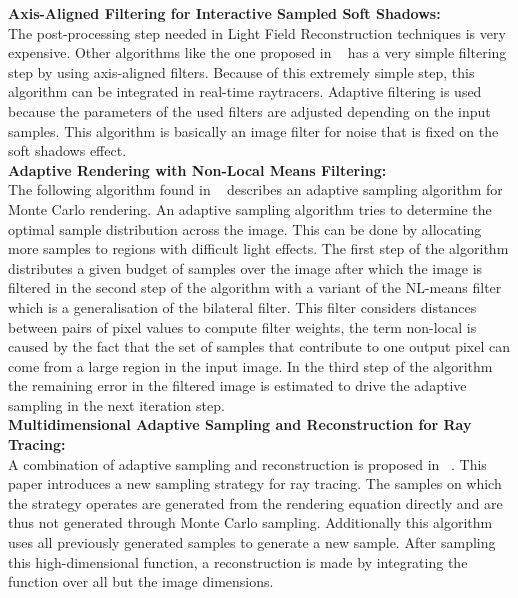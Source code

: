 \textbf{Axis-Aligned Filtering for Interactive Sampled Soft Shadows:} \\
The post-processing step needed in Light Field Reconstruction techniques is very expensive.
Other algorithms like the one proposed in ~\cite{UdayMehta:2012:AAF} has a very simple filtering step by using axis-aligned filters.
Because of this extremely simple step, this algorithm can be integrated in real-time raytracers.
Adaptive filtering is used because the parameters of the used filters are adjusted depending on the input samples.
This algorithm is basically an image filter for noise that is fixed on the soft shadows effect.
\\

\textbf{Adaptive Rendering with Non-Local Means Filtering:} \\
The following algorithm found in ~\cite{Rousselle:2012:ARN:2366145.2366214} describes an adaptive sampling algorithm for Monte Carlo rendering.
An adaptive sampling algorithm tries to determine the optimal sample distribution across the image.
This can be done by allocating more samples to regions with difficult light effects.
The first step of the algorithm distributes a given budget of samples over the image after which the image is filtered in the second step of the algorithm with a variant of the NL-means filter which is a generalisation of the bilateral filter.
This filter considers distances between pairs of pixel values to compute filter weights, the term non-local is caused by the fact that the set of samples that contribute to one output pixel can come from a large region in the input image.
In the third step of the algorithm the remaining error in the filtered image is estimated to drive the adaptive sampling in the next iteration step.
\\

\textbf{Multidimensional Adaptive Sampling and Reconstruction for Ray Tracing:} \\
A combination of adaptive sampling and reconstruction is proposed in ~\cite{Hachisuka:2008:MAS:1360612.1360632}.
This paper introduces a new sampling strategy for ray tracing.
The samples on which the strategy operates are generated from the rendering equation directly and are thus not generated through Monte Carlo sampling.
Additionally this algorithm uses all previously generated samples to generate a new sample.
After sampling this high-dimensional function, a reconstruction is made by integrating the function over all but the image dimensions.
\\

